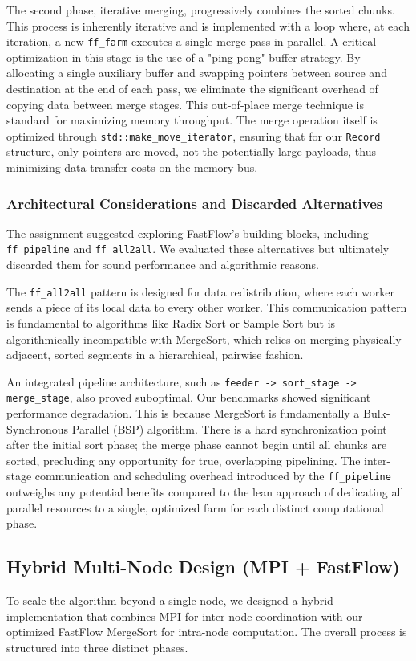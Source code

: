 \documentclass[10pt]{article}
\newcommand{\code}[1]{\texttt{#1}}
\begin{document}
The second phase, iterative merging, progressively combines the sorted chunks. This process is inherently iterative and is implemented with a loop where, at each iteration, a new \code{ff\_farm} executes a single merge pass in parallel. A critical optimization in this stage is the use of a "ping-pong" buffer strategy. By allocating a single auxiliary buffer and swapping pointers between source and destination at the end of each pass, we eliminate the significant overhead of copying data between merge stages. This out-of-place merge technique is standard for maximizing memory throughput. The merge operation itself is optimized through \code{std::make\_move\_iterator}, ensuring that for our \code{Record} structure, only pointers are moved, not the potentially large payloads, thus minimizing data transfer costs on the memory bus.

\subsubsection{Architectural Considerations and Discarded Alternatives}
The assignment suggested exploring FastFlow's building blocks, including \code{ff\_pipeline} and \code{ff\_all2all}. We evaluated these alternatives but ultimately discarded them for sound performance and algorithmic reasons.

The \code{ff\_all2all} pattern is designed for data redistribution, where each worker sends a piece of its local data to every other worker. This communication pattern is fundamental to algorithms like Radix Sort or Sample Sort but is algorithmically incompatible with MergeSort, which relies on merging physically adjacent, sorted segments in a hierarchical, pairwise fashion.

An integrated pipeline architecture, such as \code{feeder -> sort\_stage -> merge\_stage}, also proved suboptimal. Our benchmarks showed significant performance degradation. This is because MergeSort is fundamentally a Bulk-Synchronous Parallel (BSP) algorithm. There is a hard synchronization point after the initial sort phase; the merge phase cannot begin until all chunks are sorted, precluding any opportunity for true, overlapping pipelining. The inter-stage communication and scheduling overhead introduced by the \code{ff\_pipeline} outweighs any potential benefits compared to the lean approach of dedicating all parallel resources to a single, optimized farm for each distinct computational phase.


\subsection{Hybrid Multi-Node Design (MPI + FastFlow)}
To scale the algorithm beyond a single node, we designed a hybrid implementation that combines MPI for inter-node coordination with our optimized FastFlow MergeSort for intra-node computation. The overall process is structured into three distinct phases.
\end{document}
